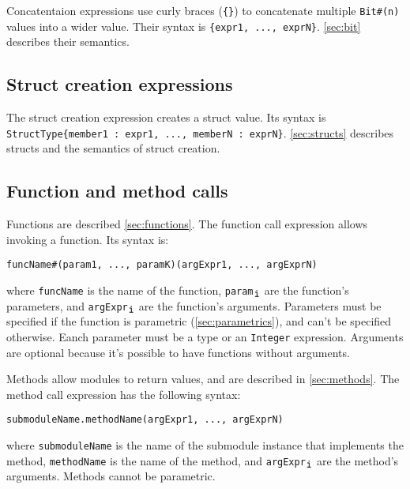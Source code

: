 Concatentaion expressions use curly braces (\verb|{}|) to concatenate multiple \verb|Bit#(n)| values into a wider value.
Their syntax is \verb|{expr1, ..., exprN}|.
\autoref{sec:bit} describes their semantics.

\subsection{Struct creation expressions}
\label{sec:structExpr}

The struct creation expression creates a struct value. Its syntax is
\texttt{StructType\{member1\,:\,expr1, ..., memberN\,:\,exprN\}}.
\autoref{sec:structs} describes structs and the semantics of struct creation.

\subsection{Function and method calls}
\label{sec:calls}

Functions are described \autoref{sec:functions}. The function call expression allows invoking a function. Its syntax is:
\begin{center}
  \verb|funcName|\tmp{$[$}\verb|#(param1, ..., paramK)|\tmp{$]$}\tmp{$[$}\verb|(argExpr1, ..., argExprN)|\tmp{$]$}
\end{center}
where \verb|funcName| is the name of the function, \verb|param|$_{\verb|i|}$ are the function's parameters,
and \verb|argExpr|$_{\verb|i|}$ are the function's arguments.
Parameters must be specified if the function is parametric (\autoref{sec:parametrics}), and can't be specified otherwise.
Eanch parameter must be a type or an \verb|Integer| expression.
Arguments are optional because it's possible to have functions without arguments. 

Methods allow modules to return values, and are described in \autoref{sec:methods}. The method call expression has the following syntax:
\begin{center}
    \verb|submoduleName.methodName|\tmp{$[$}\verb|(argExpr1, ..., argExprN)|\tmp{$]$}
\end{center}
where \verb|submoduleName| is the name of the submodule instance that implements the method,
\verb|methodName| is the name of the method, and \verb|argExpr|$_{\verb|i|}$ are the method's arguments.
Methods cannot be parametric.

